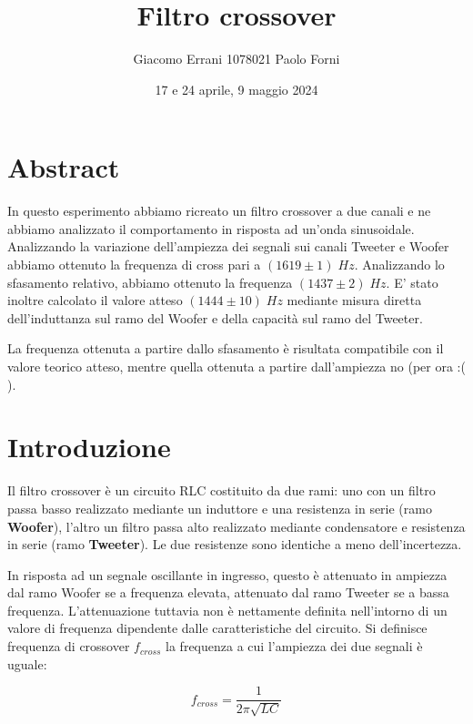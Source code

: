 \documentclass[12pt,a4paper]{article}
\title{Filtro crossover} %
\date{17 e 24 aprile, 9 maggio 2024}
\author{Giacomo Errani 1078021 Paolo Forni}
\begin{document}
\newcommand{\theoryF}{ $(1444 \pm 10) \; Hz $}
\newcommand{\amplitudeF}{$(1619 \pm 1) \; Hz $}
\newcommand{\phaseF}{$(1437 \pm 2) \; Hz $}

\maketitle

\section{Abstract}

\indent In questo esperimento abbiamo ricreato un filtro crossover a due canali e ne abbiamo analizzato il comportamento in risposta ad un'onda sinusoidale. Analizzando la variazione dell'ampiezza dei segnali sui canali Tweeter e Woofer abbiamo ottenuto la frequenza di cross pari a \amplitudeF. Analizzando lo sfasamento relativo, abbiamo ottenuto la frequenza \phaseF. E' stato inoltre calcolato il valore atteso \theoryF \hspace{1pt} mediante misura diretta dell'induttanza sul ramo del Woofer e della capacità sul ramo del Tweeter. 

La frequenza ottenuta a partire dallo sfasamento è risultata compatibile con il valore teorico atteso, mentre quella ottenuta a partire dall'ampiezza no (per ora :( ).

\section{Introduzione}
Il filtro crossover è un circuito RLC costituito da due rami: uno con un filtro passa basso realizzato mediante un induttore e una resistenza in serie (ramo \textbf{Woofer}), l'altro un filtro passa alto realizzato mediante condensatore e resistenza in serie (ramo \textbf{Tweeter}). Le due resistenze sono identiche a meno dell'incertezza.

In risposta ad un segnale oscillante in ingresso, questo è attenuato in ampiezza dal ramo Woofer se a frequenza elevata, attenuato dal ramo Tweeter se a bassa frequenza. L'attenuazione tuttavia non è nettamente definita nell'intorno di un valore di frequenza dipendente dalle caratteristiche del circuito. Si definisce frequenza di crossover $f_{cross}$ la frequenza a cui l'ampiezza dei due segnali è uguale:

\begin{equation}
\label{eqn:fcross}
f_{cross} = \frac{1}{2 \pi \sqrt{LC} }
\end{equation}
\end{document}
